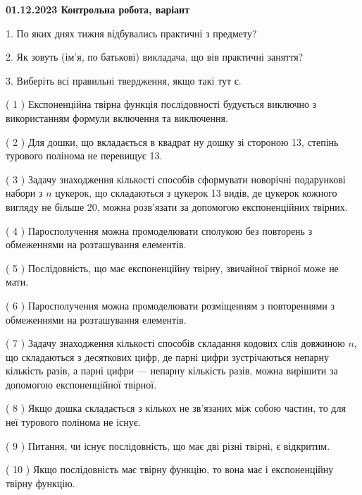 \documentclass[12pt, ukrainian]{article}
\begin{document}
\vspace{4mm}
\newpage
\begin {large}

\textbf{01.12.2023 Контрольна робота, варіант  }\par


{
1. По яких днях тижня відбувались практичні з предмету?



\vspace{5mm}
2. Як зовуть (ім'я, по батькові) викладача, що вів практичні заняття?



\vspace{5mm}
3. Виберіть всі правильні твердження, якщо такі тут є.\par
\vspace{2mm}
( 1 ) Експоненційна твірна функція послідовності будується виключно з використанням формули включення та виключення.%

( 2 ) Для дошки, що вкладається в квадрат ну дошку зі стороною 13, степінь турового полінома не перевищує 13.%

( 3 ) Задачу знаходження кількості способів сформувати новорічні подарункові набори з $n$ цукерок, що складаються з цукерок 13 видів, де цукерок кожного вигляду не більше 20, можна розв’язати за допомогою експоненційних твірних.%

( 4 ) Паросполучення можна промоделювати сполукою без повторень з обмеженнями на розташування елементів.%

( 5 ) Послідовність, що має експоненційну твірну, звичайної твірної може не мати.%

( 6 ) Паросполучення можна промоделювати розміщенням з повтореннями з обмеженнями на розташування елементів.%

( 7 ) Задачу знаходження кількості способів складання кодових слів довжиною $n$, що складаються з десяткових цифр, де парні цифри зустрічаються непарну кількість разів, а парні цифри — непарну кількість разів, можна вирішити за допомогою експоненційної твірної.%

( 8 ) Якщо дошка складається з кількох не зв’язаних між собою частин, то для неї турового полінома не існує.%

( 9 ) Питання, чи існує послідовність, що має дві різні твірні, є відкритим.%

( 10 ) Якщо послідовність має твірну функцію, то вона має і експоненційну твірну функцію.%
}
\end {large}
\end{document}
